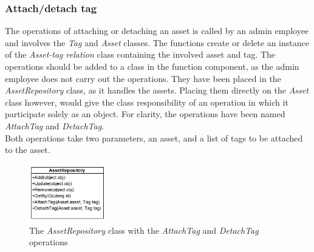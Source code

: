 \subsubsection{Attach/detach tag}
The operations of attaching or detaching an asset is called by an admin employee and involves the \textit{Tag} and \textit{Asset} classes. The functions create or delete an instance of the \textit{Asset-tag relation} class containing the involved asset and tag. The operations should be added to a class in the function component, as the admin employee does not carry out the operations. They have been placed in the \textit{AssetRepository} class, as it handles the assets. Placing them directly on the \textit{Asset} class however, would give the class responsibility of an operation in which it participate solely as an object. For clarity, the operations have been named \textit{AttachTag} and \textit{DetachTag}.\\
Both operations take two parameters, an asset, and a list of tags to be attached to the asset.
\begin{figure}[H]
    \centering
    \includegraphics[width=0.3\textwidth]{figures/FunctionComponent/AttachTag.png}
    \caption{The \textit{AssetRepository} class with the \textit{AttachTag} and \textit{DetachTag} operations}
    \label{fig:AttachDetachTag}
\end{figure}

